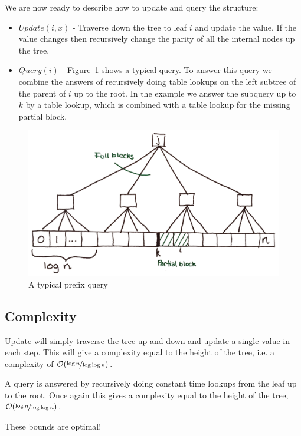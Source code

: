 \documentclass[a4paper,oneside,article,11pt]{memoir}
\begin{document}
We are now ready to describe how to update and query the structure:
\begin{itemize}
	\item{$Update(i, x)$ - Traverse down the tree to leaf $i$ and update the value. If the value changes then recursively change the parity of all the internal nodes up the tree.}
	\item{$Query(i)$ - Figure~\ref{fig:pre_query} shows a typical query. To answer this query we combine the answers of recursively doing table lookups on the left subtree of the parent of $i$ up to the root. In the example we answer the subquery up to $k$ by a table lookup, which is combined with a table lookup for the missing partial block.}
\end{itemize}

\begin{figure}
\includegraphics[width=\textwidth]{../figures/pre_query.png}
\caption{\label{fig:pre_query}A typical prefix query}
\end{figure}

\subsection{Complexity}
Update will simply traverse the tree up and down and update a single value in each step. This will give a complexity equal to the height of the tree, i.e. a complexity of $\mathcal{O}(\nicefrac{\log n}{\log\log n})$.

A query is answered by recursively doing constant time lookups from the leaf up to the root. Once again this gives a complexity equal to the height of the tree, $\mathcal{O}(\nicefrac{\log n}{\log\log n})$.

These bounds are optimal!

\pagebreak


\end{document}
